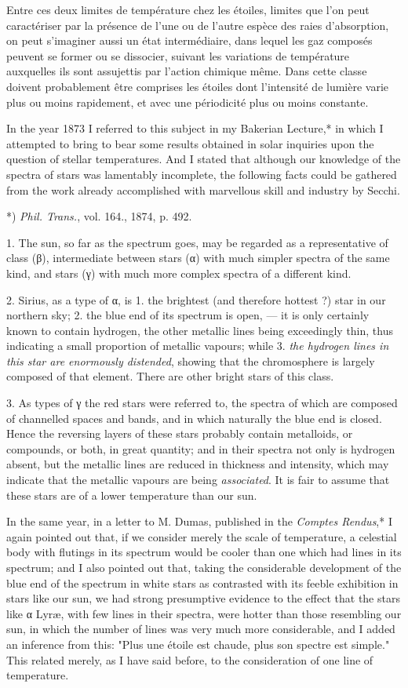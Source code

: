 \documentclass[a4paper, 12pt, oneside, polutonikogreek, english]{article}
\begin{document}
Entre ces deux limites de température chez les étoiles, limites que l'on peut caractériser par la présence de l'une ou de l'autre espèce des raies d'absorption, on peut s'imaginer aussi un état intermédiaire, dans lequel les gaz composés peuvent se former ou se dissocier, suivant les variations de température auxquelles ils sont assujettis par l'action chimique même. Dans cette classe doivent probablement être comprises les étoiles dont l'intensité de lumière varie plus ou moins rapidement, et avec une périodicité plus ou moins constante.

In the year 1873 I referred to this subject in my Bakerian Lecture,* in which I attempted to bring to bear some results obtained in solar inquiries upon the question of stellar temperatures. And I stated that although our knowledge of the spectra of stars was lamentably incomplete, the following facts could be gathered from the work already accomplished with marvellous skill and industry by Secchi.

*) \emph{Phil. Trans.}, vol. 164., 1874, p. 492.

1. The sun, so far as the spectrum goes, may be regarded as a representative of class (β), intermediate between stars (α) with much simpler spectra of the same kind, and stars (γ) with much more complex spectra of a different kind.

2. Sirius, as a type of α, is 1. the brightest (and therefore hottest ?) star in our northern sky; 2. the blue end of its spectrum is open, --- it is only certainly known to contain hydrogen, the other metallic lines being exceedingly thin, thus indicating a small proportion of metallic vapours; while 3. \emph{the hydrogen lines in this star are enormously distended}, showing that the chromosphere is largely composed of that element. There are other bright stars of this class.

3. As types of γ the red stars were referred to, the spectra of which are composed of channelled spaces and bands, and in which naturally the blue end is closed. Hence the reversing layers of these stars probably contain metalloids, or compounds, or both, in great quantity; and in their spectra not only is hydrogen absent, but the metallic lines are reduced in thickness and intensity, which may indicate that the metallic vapours are being \emph{associated}. It is fair to assume that these stars are of a lower temperature than our sun.

In the same year, in a letter to M. Dumas, published in the \emph{Comptes Rendus},* I again pointed out that, if we consider merely the scale of temperature, a celestial body with flutings in its spectrum would be cooler than one which had lines in its spectrum; and I also pointed out that, taking the considerable development of the blue end of the spectrum in white stars as contrasted with its feeble exhibition in stars like our sun, we had strong presumptive evidence to the effect that the stars like α Lyræ, with few lines in their spectra, were hotter than those resembling our sun, in which the number of lines was very much more considerable, and I added an inference from this: "Plus une étoile est chaude, plus son spectre est simple." This related merely, as I have said before, to the consideration of one line of temperature.
\end{document}
